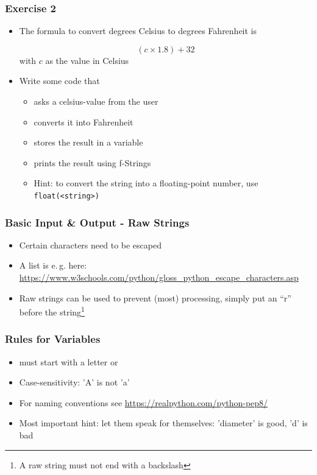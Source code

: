 \documentclass[english]{beamer}
\begin{document}
\begin{frame}
\frametitle{Exercise 2}

\begin{itemize}
\item The formula to convert degrees Celsius to \newline degrees Fahrenheit is

\[  (c \times 1.8) + 32 \] with $c$ as the value in Celsius

\item Write some code that 

\begin{itemize}
	\item asks a celsius-value from the user
	\item converts it into Fahrenheit 
	\item stores the result in a variable
	\item prints the result using f-Strings
	\item Hint: to convert the string into a \newline floating-point number, use \texttt{float(<string>)}
	\end{itemize}

\end{itemize}
\end{frame}


\begin{frame}[fragile]
\frametitle{Basic Input \& Output - Raw Strings}

\begin{itemize}
	\item Certain characters need to be escaped
	\item A list is e.\,g. here: \url{https://www.w3schools.com/python/gloss_python_escape_characters.asp} 
	\item Raw strings can be used to prevent (most) processing, simply put an \enquote{r} before the string\footnote{A raw string must not end with a backslash}
	\end{itemize}




\end{frame}


\begin{frame}
\frametitle{Rules for Variables}

\begin{itemize}
\item must start with a letter or \textunderscore
\item Case-sensitivity: 'A' is not 'a'
\item For naming conventions see \url{https://realpython.com/python-pep8/}
\item Most important hint: let them speak for themselves: 'diameter' is good, 'd' is bad 
\end{itemize}
\end{frame}
\end{document}
